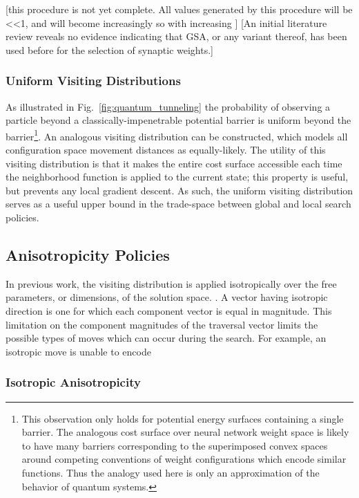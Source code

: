 \documentclass[11pt]{afthesis}
\begin{document}
	
	[this procedure is not yet complete. All values generated by this procedure will be <<1, and will become increasingly so with increasing ]
	[An initial literature review reveals no evidence indicating that GSA, or any variant thereof, has been used before for the selection of synaptic weights.]
	
	\subsubsection{Uniform Visiting Distributions}
	
	As illustrated in Fig.~\ref{fig:quantum_tunneling} the probability of observing a particle beyond a classically-impenetrable potential barrier is uniform beyond the barrier\footnote{This observation only holds for potential energy surfaces containing a single barrier. The analogous cost surface over neural network weight space is likely to have many barriers corresponding to the superimposed convex spaces around competing conventions of weight configurations which encode similar functions. Thus the analogy used here is only an approximation of the behavior of quantum systems.}. An analogous visiting distribution can be constructed, which models all configuration space movement distances as equally-likely. The utility of this visiting distribution is that it makes the entire cost surface accessible each time the neighborhood function is applied to the current state; this property is useful, but prevents any local gradient descent. As such, the uniform visiting distribution serves as a useful upper bound in the trade-space between global and local search policies. 
	
	\subsection{Anisotropicity Policies}
	
	In previous work, the visiting distribution is applied isotropically over the free parameters, or dimensions, of the solution space. \cite{tsallis1996generalizedsimulatedannealing}. A vector having isotropic direction is one for which each component vector is equal in magnitude. This limitation on the component magnitudes of the traversal vector limits the possible types of moves which can occur during the search. For example, an isotropic move is unable to encode 
	
	\subsubsection{Isotropic Anisotropicity}
	
\end{document}
